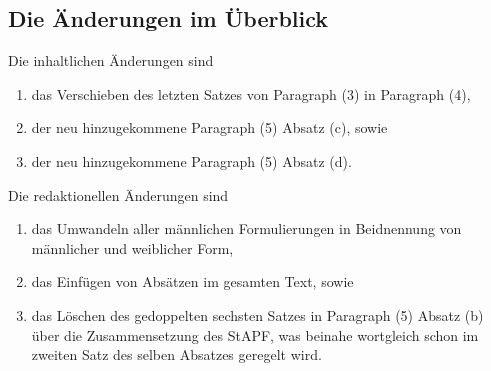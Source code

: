 \documentclass[draft,a4,12pt,oneside]{scrartcl}
\begin{document}
\subsection*{Die Änderungen im Überblick}

Die inhaltlichen Änderungen sind
\begin{enumerate}
\item das Verschieben des letzten Satzes von Paragraph (3) in Paragraph (4),
\item der neu hinzugekommene Paragraph (5) Absatz (c), sowie
\item der neu hinzugekommene Paragraph (5) Absatz (d).
\end{enumerate}

Die redaktionellen Änderungen sind
\begin{enumerate}
\item das Umwandeln aller männlichen Formulierungen in Beidnennung von männlicher und weiblicher Form,
\item das Einfügen von Absätzen im gesamten Text, sowie
\item das Löschen des gedoppelten sechsten Satzes in Paragraph (5) Absatz (b) über die Zusammensetzung des StAPF,
      was beinahe wortgleich schon im zweiten Satz des selben Absatzes geregelt wird.
\end{enumerate}
\end{document}
